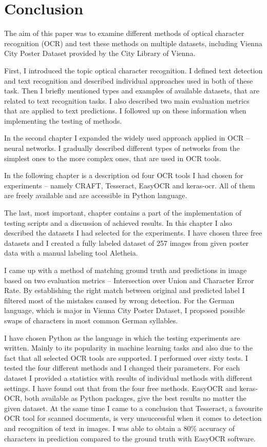\chapter*{Conclusion}

The aim of this paper was to examine different methods of optical character recognition (OCR) and test these methods on multiple datasets, including Vienna City Poster Dataset provided by the City Library of Vienna.

First, I introduced the topic optical character recognition. I defined text detection and text recognition and described individual approaches used in both of these task. Then I briefly mentioned types and examples of available datasets, that are related to text recognition tasks. I also described two main evaluation metrics that are applied to text predictions. I followed up on these information when implementing the testing of methods.

In the second chapter I expanded the widely used approach applied in OCR -- neural networks. I gradually described different types of networks from the simplest ones to the more complex ones, that are used in OCR tools. 

In the following chapter is a description od four OCR tools I had chosen for experiments -- namely CRAFT, Tesseract, EasyOCR and keras-ocr. All of them are freely available and are accessible in Python language.

The last, most important, chapter contains a part of the implementation of testing scripts and a discussion of achieved results. In this chapter I also described the datasets I had selected for the experiments. I have chosen three free datasets and I created a fully labeled dataset of 257 images from given poster data with a manual labeling tool Aletheia.

I came up with a method of matching ground truth and predictions in image based on two evaluation metrics -- Intersection over Union and Character Error Rate. By establishing the right match between original and predicted label I filtered most of the mistakes caused by wrong detection. For the German language, which is major in Vienna City Poster Dataset, I proposed  possible swaps of characters in most common German syllables.

I have chosen Python as the language in which the testing experiments are written. Mainly to its popularity in machine learning tasks and also due to the fact that all selected OCR tools are supported. I performed over sixty tests. I tested the four different methods and I changed their parameters. For each dataset I provided a statistics with results of individual methods with different settings. I have found out that from the four free methods. EasyOCR and keras-OCR, both available as Python packages, give the best results no matter the given dataset. At the same time I came to a conclusion that Tesseract, a favourite OCR tool for scanned documents, is very unsuccessful when it comes to detection and recognition of text in images. I was able to obtain a $80\%$  accuracy of characters in prediction compared to the ground truth with EasyOCR software.

